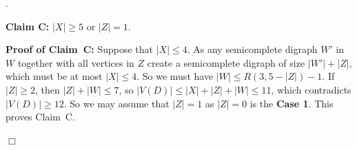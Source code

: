 \documentclass{article}
\newcommand{\2}{\vspace{2mm}}
\renewenvironment{proof}[1][]{\par \noindent {\bf Proof#1}.\ }{\hfill$\Box$
\par \vspace{11pt}}
\theoremstyle{definition}
\begin{document}
\begin{proof}






\2

{\bf Claim C:} {$|X| \ge 5$ or $|Z|=1$.}

\2

{\bf Proof of Claim~C:}
Suppose that $|X|\le 4$. As any semicomplete digraph $W'$ in $W$ together with all vertices in $Z$ create a semicomplete digraph of size $|W'|+|Z|$, which must be at most $|X|\le 4$. So we must have $|W| \le R(3,5-|Z|)-1$. If $|Z| \ge 2$, then $|Z|+|W| \le 7$, so $|V(D)| \le |X|+|Z|+|W| \le 11$, which contradicts  $|V(D)| \ge 12$.
So we may assume that $|Z|=1$ as $|Z|=0$ is the \textbf{Case 1}.
This proves Claim~C.


\end{proof}
\end{document}
